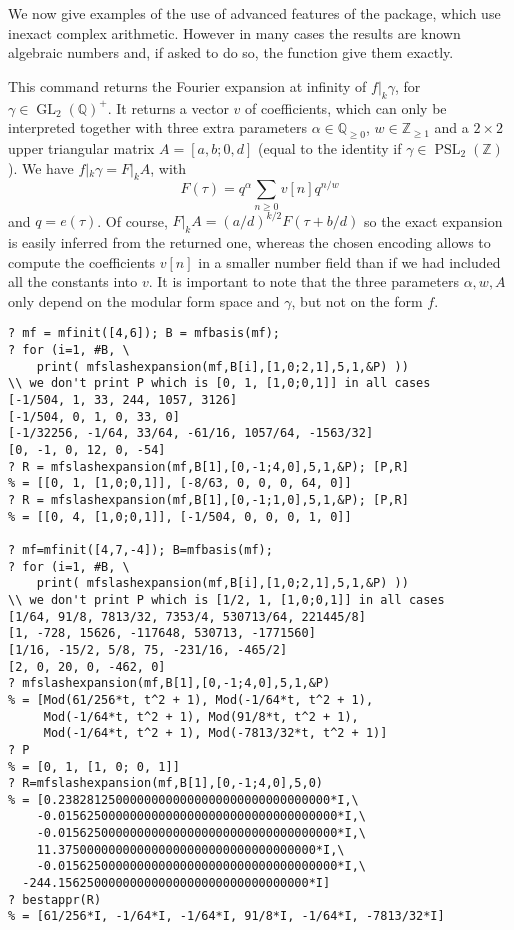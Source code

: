 \documentclass[11pt]{article}
\DeclareMathOperator{\PSL}{PSL}
\DeclareMathOperator{\GL}{GL}
\newcommand{\Q}{{\mathbb Q}}
\newcommand{\Z}{{\mathbb Z}}
\newcommand{\al}{\alpha}
\begin{document}
We now give examples of the use of advanced features of the package, which
use inexact complex arithmetic. However in many cases the results are known
algebraic numbers and, if asked to do so, the function give them exactly.

This command returns the Fourier expansion at infinity of $f |_k \gamma$,
for $\gamma\in \GL_2(\Q)^+$. It returns a vector $v$ of coefficients, which
can only be interpreted together with three extra parameters
$\al\in \Q_{\geq 0}$, $w \in \Z_{\geq 1}$ and a
$2\times 2$ upper triangular matrix $A=[a,b;0,d]$
(equal to the identity if $\gamma\in\PSL_2(\Z)$). We have
$f |_k \gamma = F |_k A $, with
$$F(\tau) = q^\al \sum_{n\geq 0} v[n] q^{n/w}$$
and $q = e(\tau)$. Of course, $F |_k A = (a/d)^{k/2} F(\tau + b/d)$ so the
exact expansion is easily inferred from the returned one, whereas the chosen
encoding allows to compute the coefficients $v[n]$ in a smaller number field
than if we had included all the constants into $v$. It is important to note
that the three parameters $\al, w, A$ only depend on the modular form
space and $\gamma$, but not on the form $f$.

\begin{verbatim}
? mf = mfinit([4,6]); B = mfbasis(mf);
? for (i=1, #B, \
    print( mfslashexpansion(mf,B[i],[1,0;2,1],5,1,&P) ))
\\ we don't print P which is [0, 1, [1,0;0,1]] in all cases
[-1/504, 1, 33, 244, 1057, 3126]
[-1/504, 0, 1, 0, 33, 0]
[-1/32256, -1/64, 33/64, -61/16, 1057/64, -1563/32]
[0, -1, 0, 12, 0, -54]
? R = mfslashexpansion(mf,B[1],[0,-1;4,0],5,1,&P); [P,R]
% = [[0, 1, [1,0;0,1]], [-8/63, 0, 0, 0, 64, 0]]
? R = mfslashexpansion(mf,B[1],[0,-1;1,0],5,1,&P); [P,R]
% = [[0, 4, [1,0;0,1]], [-1/504, 0, 0, 0, 1, 0]]

? mf=mfinit([4,7,-4]); B=mfbasis(mf);
? for (i=1, #B, \
    print( mfslashexpansion(mf,B[i],[1,0;2,1],5,1,&P) ))
\\ we don't print P which is [1/2, 1, [1,0;0,1]] in all cases
[1/64, 91/8, 7813/32, 7353/4, 530713/64, 221445/8]
[1, -728, 15626, -117648, 530713, -1771560]
[1/16, -15/2, 5/8, 75, -231/16, -465/2]
[2, 0, 20, 0, -462, 0]
? mfslashexpansion(mf,B[1],[0,-1;4,0],5,1,&P)
% = [Mod(61/256*t, t^2 + 1), Mod(-1/64*t, t^2 + 1),
     Mod(-1/64*t, t^2 + 1), Mod(91/8*t, t^2 + 1),
     Mod(-1/64*t, t^2 + 1), Mod(-7813/32*t, t^2 + 1)]
? P
% = [0, 1, [1, 0; 0, 1]]
? R=mfslashexpansion(mf,B[1],[0,-1;4,0],5,0)
% = [0.23828125000000000000000000000000000000*I,\
    -0.015625000000000000000000000000000000000*I,\
    -0.015625000000000000000000000000000000000*I,\
    11.375000000000000000000000000000000000*I,\
    -0.015625000000000000000000000000000000000*I,\
  -244.15625000000000000000000000000000000*I]
? bestappr(R)
% = [61/256*I, -1/64*I, -1/64*I, 91/8*I, -1/64*I, -7813/32*I]
\end{verbatim}
\end{document}
